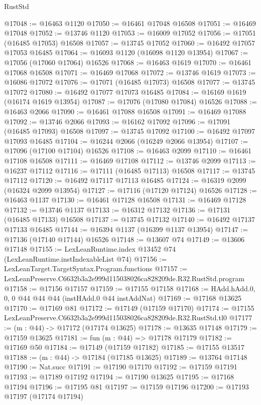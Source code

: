 \begin{lexlean}{RustStd}
\begin{coremodule}
@17048 := @16463 @1120
@17050 := @16461 @17048 @16508
@17051 := @16469 @17048
@17052 := @13746 @1120
@17053 := @16009 @17052
@17056 := @17051 (@16485 @17053) @16508
@17057 := @13745 @17052
@17060 := @16492 @17057 @17053 @16485
@17064 := @16093 @1120 (@16098 @1120 @13954)
@17067 := @17056 (@17060 @17064) @16526
@17068 := @16463 @1619
@17070 := @16461 @17068 @16508
@17071 := @16469 @17068
@17072 := @13746 @1619
@17073 := @16086 @17072
@17076 := @17071 (@16485 @17073) @16508
@17077 := @13745 @17072
@17080 := @16492 @17077 @17073 @16485
@17084 := @16169 @1619 (@16174 @1619 @13954)
@17087 := @17076 (@17080 @17084) @16526
@17088 := @16463 @2066
@17090 := @16461 @17088 @16508
@17091 := @16469 @17088
@17092 := @13746 @2066
@17093 := @16162 @17092
@17096 := @17091 (@16485 @17093) @16508
@17097 := @13745 @17092
@17100 := @16492 @17097 @17093 @16485
@17104 := @16244 @2066 (@16249 @2066 @13954)
@17107 := @17096 (@17100 @17104) @16526
@17108 := @16463 @2099
@17110 := @16461 @17108 @16508
@17111 := @16469 @17108
@17112 := @13746 @2099
@17113 := @16237 @17112
@17116 := @17111 (@16485 @17113) @16508
@17117 := @13745 @17112
@17120 := @16492 @17117 @17113 @16485
@17124 := @16319 @2099 (@16324 @2099 @13954)
@17127 := @17116 (@17120 @17124) @16526
@17128 := @16463 @1137
@17130 := @16461 @17128 @16508
@17131 := @16469 @17128
@17132 := @13746 @1137
@17133 := @16312 @17132
@17136 := @17131 (@16485 @17133) @16508
@17137 := @13745 @17132
@17140 := @16492 @17137 @17133 @16485
@17144 := @16394 @1137 (@16399 @1137 @13954)
@17147 := @17136 (@17140 @17144) @16526
@17148 := @13607 @74
@17149 := @13606 @17148
@17155 := LexLeanRuntime.index @13452 @74 (LexLeanRuntime.instIndexableList @74)
@17156 := LexLeanTarget.TargetSyntax.Program.functions
@17157 := LexLeanPreserve.C6632b3a2e999d115038026ca828209de.R32.RustStd.program
@17158 := @17156 @17157
@17159 := @17155 @17158
@17168 := HAdd.hAdd.{0, 0, 0} @44 @44 @44 (instHAdd.{0} @44 instAddNat)
@17169 := @17168 @13625
@17170 := @17169 @81
@17172 := @17149 (@17159 @17170)
@17174 := @17155 LexLeanPreserve.C6632b3a2e999d115038026ca828209de.R32.RustStd.tl0
@17177 := (m : @44) -> @17172 (@17174 @13625)
@17178 := @13635 @17148
@17179 := @17159 @13625
@17181 := fun (m : @44) => @17178 @17179
@17182 := @17169 @50
@17184 := @17149 (@17159 @17182)
@17185 := @17155 @13517
@17188 := (m : @44) -> @17184 (@17185 @13625)
@17189 := @13764 @17148
@17190 := Nat.succ
@17191 := @17190 @17170
@17192 := @17159 @17191
@17193 := @17189 @17192
@17194 := @17190 @13625
@17195 := @17168 @17194
@17196 := @17195 @81
@17197 := @17159 @17196
@17200 := @17193 @17197 (@17174 @17194)

\end{coremodule}
\end{lexlean}
